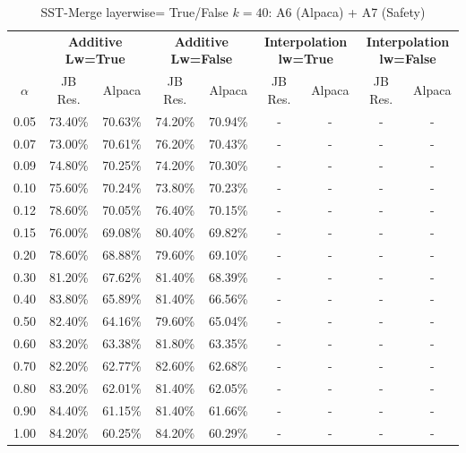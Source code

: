 \begin{table}[h]
\centering
\caption{SST-Merge layerwise= True/False $k=40$: A6 (Alpaca) + A7 (Safety)}
\label{tab:res_a6_sst_40}
\begin{tabular}{c|cc|cc|cc|cc}
\hline
 & \multicolumn{2}{c|}{\textbf{Additive Lw=True}} & \multicolumn{2}{c|}{\textbf{Additive Lw=False}} & \multicolumn{2}{c|}{\textbf{Interpolation lw=True}}& \multicolumn{2}{c}{\textbf{Interpolation lw=False}} \\
$\alpha$ & JB Res. & Alpaca & JB Res. & Alpaca & JB Res. & Alpaca & JB Res. & Alpaca \\
\hline
0.05 & 73.40\% & 70.63\% & 74.20\% & 70.94\% & - & - & - & - \\
0.07 & 73.00\% & 70.61\% & 76.20\% & 70.43\% & - & - & - & - \\
0.09 & 74.80\% & 70.25\% & 74.20\% & 70.30\% & - & - & - & - \\
0.10 & 75.60\% & 70.24\% & 73.80\% & 70.23\% & - & - & - & - \\
0.12 & 78.60\% & 70.05\% & 76.40\% & 70.15\% & - & - & - & - \\
0.15 & 76.00\% & 69.08\% & 80.40\% & 69.82\% & - & - & - & - \\
0.20 & 78.60\% & 68.88\% & 79.60\% & 69.10\% & - & - & - & - \\
0.30 & 81.20\% & 67.62\% & 81.40\% & 68.39\% & - & - & - & - \\
0.40 & 83.80\% & 65.89\% & 81.40\% & 66.56\% & - & - & - & - \\
0.50 & 82.40\% & 64.16\% & 79.60\% & 65.04\% & - & - & - & - \\
0.60 & 83.20\% & 63.38\% & 81.80\% & 63.35\% & - & - & - & - \\
0.70 & 82.20\% & 62.77\% & 82.60\% & 62.68\% & - & - & - & - \\
0.80 & 83.20\% & 62.01\% & 81.40\% & 62.05\% & - & - & - & - \\
0.90 & 84.40\% & 61.15\% & 81.40\% & 61.66\% & - & - & - & - \\
1.00 & 84.20\% & 60.25\% & 84.20\% & 60.29\% & - & - & - & - \\
\hline
\end{tabular}
\end{table}
\FloatBarrier

